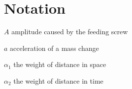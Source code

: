 {}
\chapter*{Notation}

\begin{compactitem}[]
	\item $A$ amplitude caused by the feeding screw
	\item $a$ acceleration of a mass change
	\item $\alpha_1$ the weight of distance in space
	\item $\alpha_2$ the weight of distance in time
\end{compactitem}